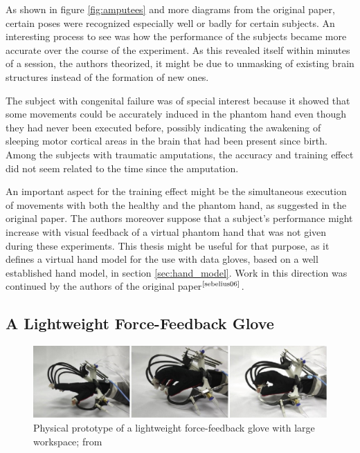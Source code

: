 \documentclass[hyperref, bachelorofscience]{cgvpub}
\newcommand{\newcite}[1]{$ ^{\text{\cite{#1}}} $}
\begin{document}
As shown in figure \ref{fig:amputees} and more diagrams from the original paper, certain poses were recognized especially well or badly for certain subjects. An interesting process to see was how the performance of the subjects became more accurate over the course of the experiment. As this revealed itself within minutes of a session, the authors theorized, it might be due to unmasking of existing brain structures instead of the formation of new ones. 

The subject with congenital failure was of special interest because it showed that some movements could be accurately induced in the phantom hand even though they had never been executed before, possibly indicating the awakening of sleeping motor cortical areas in the brain that had been present since birth. Among the subjects with traumatic amputations, the accuracy and training effect did not seem related to the time since the amputation.

An important aspect for the training effect might be the simultaneous execution of movements with both the healthy and the phantom hand, as suggested in the original paper. The authors moreover suppose that a subject's performance might increase with visual feedback of a virtual phantom hand that was not given during these experiments. This thesis might be useful for that purpose, as it defines a virtual hand model for the use with data gloves, based on a well established hand model, in section \ref{sec:hand_model}. Work in this direction was continued by the authors of the original paper\newcite{sebelius06}.

\subsection{A Lightweight Force-Feedback Glove}
\begin{figure}
	\centering
	\includegraphics{../pics/force_feedback_proto}
	\caption{Physical prototype of a lightweight force-feedback glove with large workspace; from 
		\cite{zheng18}}
	\label{fig:force_feedback_proto}
\end{figure}
\end{document}
